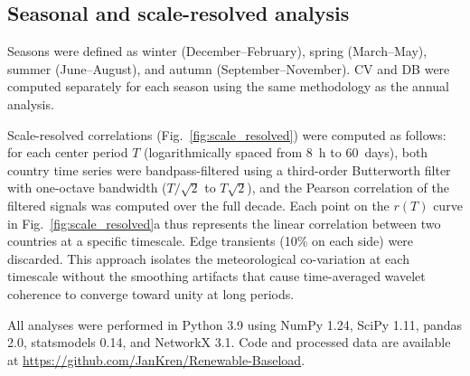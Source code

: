 \documentclass{article}
\begin{document}
\subsection{Seasonal and scale-resolved analysis}

Seasons were defined as winter (December--February), spring (March--May), summer (June--August), and autumn (September--November). CV and DB were computed separately for each season using the same methodology as the annual analysis.

Scale-resolved correlations (Fig.~\ref{fig:scale_resolved}) were computed as follows: for each center period $T$ (logarithmically spaced from 8~h to 60~days), both country time series were bandpass-filtered using a third-order Butterworth filter with one-octave bandwidth ($T/\sqrt{2}$ to $T\sqrt{2}$), and the Pearson correlation of the filtered signals was computed over the full decade. Each point on the $r(T)$ curve in Fig.~\ref{fig:scale_resolved}a thus represents the linear correlation between two countries at a specific timescale. Edge transients (10\% on each side) were discarded. This approach isolates the meteorological co-variation at each timescale without the smoothing artifacts that cause time-averaged wavelet coherence to converge toward unity at long periods.

All analyses were performed in Python 3.9 using NumPy 1.24, SciPy 1.11, pandas 2.0, statsmodels 0.14, and NetworkX 3.1. Code and processed data are available at \url{https://github.com/JanKren/Renewable-Baseload}.
\end{document}
